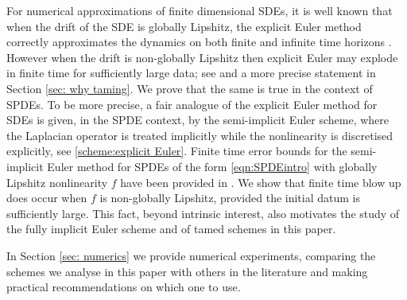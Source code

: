 \documentclass[reqno, 11pt]{amsart}
\theoremstyle{plain}
\theoremstyle{definition}
\theoremstyle{remark}
\numberwithin{equation}{section}
\numberwithin{theorem}{section}
\begin{document}
{For numerical approximations of finite dimensional SDEs, it is well known that when the drift of the SDE is globally Lipshitz, the explicit Euler method correctly approximates  the dynamics on both  finite and  infinite time horizons \cite{mattingly2002ergodicity, Angeli, gyongy2005discretization}. However when the drift is  non-globally Lipshitz then explicit Euler may explode in finite time for sufficiently large data; see \cite[Lemma 6.3]{mattingly2002ergodicity} and a more precise statement in Section \ref{sec: why taming}. We prove that the same is true in the context of SPDEs. To be more precise, a fair analogue of the explicit Euler method for SDEs is given, in the SPDE context, by  the semi-implicit Euler scheme, where the Laplacian operator is treated implicitly while the nonlinearity is discretised explicitly, see \eqref{scheme:explicit Euler}.  Finite time error bounds for the semi-implicit Euler method for SPDEs of the form \eqref{eqn:SPDEintro} with globally Lipshitz  nonlinearity $f$ have  been provided in \cite{debussche2011weak}. We show that finite time blow up does occur when $f$ is non-globally Lipshitz, provided the initial datum is  sufficiently large. This fact, beyond intrinsic interest, also motivates the study of the fully implicit Euler scheme and of tamed schemes in this paper. 

In Section \ref{sec: numerics} we provide numerical experiments, comparing the schemes we analyse in this paper with others in the literature and making practical recommendations on which one to use. 


}
\end{document}
